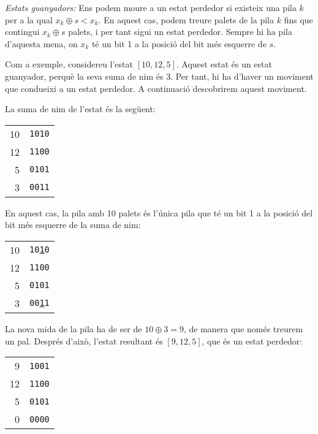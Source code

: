 \textit{Estats guanyadors:} Ens podem moure a un estat perdedor si
existeix una pila $k$ per a la qual $x_k \oplus s < x_k$. En aquest
cas, podem treure palets de la pila $k$ fins que contingui $x_k \oplus
s$ palets, i per tant sigui un estat perdedor. Sempre hi ha pila
d'aquesta mena, on $x_k$ té un bit 1 a la posició del bit més esquerre
de $s$.

Com a exemple, considereu l'estat $[10,12,5]$. Aquest estat és un
estat guanyador, perquè la seva suma de nim és 3. Per tant, hi ha
d'haver un moviment que condueixi a un estat perdedor. A continuació
descobrirem aquest moviment.

La suma de nim de l'estat és la següent:


\begin{center}
\begin{tabular}{r|r}
10 & \texttt{1010} \\
12 & \texttt{1100} \\
5 & \texttt{0101} \\
\hline
3 & \texttt{0011} \\
\end{tabular}
\end{center}


En aquest cas, la pila amb 10 palets és l'única pila que té un bit 1 a
la posició del bit més esquerre de la suma de nim:


\begin{center}
\begin{tabular}{r|r}
10 & \texttt{10\underline{1}0} \\
12 & \texttt{1100} \\
5 & \texttt{0101} \\
\hline
3 & \texttt{00\underline{1}1} \\
\end{tabular}
\end{center}


La nova mida de la pila ha de ser de $10 \oplus 3 = 9$, de manera que
només treurem un pal. Després d'això, l'estat resultant és $[9,12,5]$,
que és un estat perdedor:


\begin{center}
\begin{tabular}{r|r}
9 & \texttt{1001} \\
12 & \texttt{1100} \\
5 & \texttt{0101} \\
\hline
0 & \texttt{0000} \\
\end{tabular}
\end{center}


